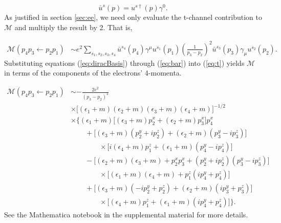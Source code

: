 \documentclass{article}
\begin{document}
\begin{equation}
  \bar{u}^s(p) = u^{s\dag}(p)\gamma^0.
  \label{eq:bar}
\end{equation}
%
As justified in section \ref{sec:ee}, we need only evaluate the t-channel
contribution to $\mathcal{M}$ and multiply the result by 2.  That is, 

\begin{equation} 
  \label{eq:t} 
  \begin{aligned} 
    \mathcal{M}(p_4p_3\leftarrow
    p_2p_1) 
    &\sim
    e^2 \sum_{s_1,s_2,s_3, s_4}
      \bar{u}^{s_4}\left(p_4\right)\gamma^{\mu}u^{s_1}\left(p_1\right)
      \left(\frac{1}{p_3 - p_2}\right)^2
      \bar{u}^{s_3}\left(p_3\right)\gamma_{\mu}u^{s_2}\left(p_2\right).
  \end{aligned} 
\end{equation}
%
Substituting equations (\ref{eq:diracBasis}) through (\ref{eq:bar}) into
(\ref{eq:t}) yields $\mathcal{M}$ in terms of the components of the electrons'
4-momenta.

\begin{equation}
\begin{aligned}
\mathcal{M}(p_4p_3\leftarrow p_2p_1)
&\sim
-\frac{2e^2}{(p_3 - p_2)^2}
\\&\times
\big[(\epsilon_1 + m)(\epsilon_2 + m)(\epsilon_3 + m)(\epsilon_4 + m)\big]^{-1/2}
\\&\times\Big\{
    (\epsilon_1 + m)\big[(\epsilon_3 + m)p^x_2 + (\epsilon_2 + m) p^x_3\big]p^x_4
    \\&\qquad+
    \big[(\epsilon_3 + m)(p^y_2 + ip^z_2) + (\epsilon_2 + m)(p^y_3 - ip^z_3)\big]
        \\&\qquad\qquad\times
        \big[i(\epsilon_4 + m)p^z_1 + (\epsilon_1 + m)(p^y_4 - ip^z_4)\big]
    \\&\qquad-
    \big[(\epsilon_2 + m)(\epsilon_3 + m) + p^x_2p^x_3
        + (p^y_2 + ip^z_2)( p^y_3 - ip^z_3)\big]
        \\&\qquad\qquad\times
        \big[(\epsilon_1 + m) (\epsilon_4 + m) + p^z_1(ip^y_4 + p^z_4)\big] 
    \\&\qquad+
    \big[(\epsilon_3 + m)(-ip^y_2 + p^z_2) + (\epsilon_2 + m)(ip^y_3 + p^z_3)\big]
        \\&\qquad\qquad\times
    \big[(\epsilon_4 + m)p^z_1 + (\epsilon_1 + m)(ip^y_4 + p^z_4)\big]
\Big\}.
\end{aligned}
\end{equation}
%
See the Mathematica \cite{Mathematica} notebook in the supplemental material
for more details.
\end{document}
